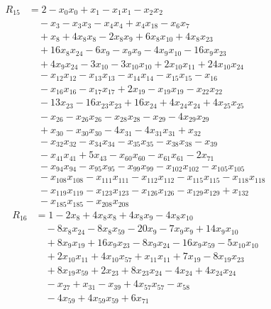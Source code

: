 \begin{align*}
R_{15}&={}2 -x_{0}x_{0} +x_{1} -x_{1}x_{1} -x_{2}x_{2}\\
&\quad{}-x_{3} -x_{3}x_{3} -x_{4}x_{4} +x_{4}x_{18} -x_{6}x_{7}\\
&\quad{}+x_{8} +4x_{8}x_{8} -2x_{8}x_{9} +6x_{8}x_{10} +4x_{8}x_{23}\\
&\quad{}+16x_{8}x_{24} -6x_{9} -x_{9}x_{9} -4x_{9}x_{10} -16x_{9}x_{23}\\
&\quad{}+4x_{9}x_{24} -3x_{10} -3x_{10}x_{10} +2x_{10}x_{11} +24x_{10}x_{24}\\
&\quad{}-x_{12}x_{12} -x_{13}x_{13} -x_{14}x_{14} -x_{15}x_{15} -x_{16}\\
&\quad{}-x_{16}x_{16} -x_{17}x_{17} +2x_{19} -x_{19}x_{19} -x_{22}x_{22}\\
&\quad{}-13x_{23} -16x_{23}x_{23} +16x_{24} +4x_{24}x_{24} +4x_{25}x_{25}\\
&\quad{}-x_{26} -x_{26}x_{26} -x_{28}x_{28} -x_{29} -4x_{29}x_{29}\\
&\quad{}+x_{30} -x_{30}x_{30} -4x_{31} -4x_{31}x_{31} +x_{32}\\
&\quad{}-x_{32}x_{32} -x_{34}x_{34} -x_{35}x_{35} -x_{38}x_{38} -x_{39}\\
&\quad{}-x_{41}x_{41} +5x_{43} -x_{60}x_{60} -x_{61}x_{61} -2x_{71}\\
&\quad{}-x_{94}x_{94} -x_{95}x_{95} -x_{99}x_{99} -x_{102}x_{102} -x_{105}x_{105}\\
&\quad{}-x_{108}x_{108} -x_{111}x_{111} -x_{112}x_{112} -x_{115}x_{115} -x_{118}x_{118}\\
&\quad{}-x_{119}x_{119} -x_{123}x_{123} -x_{126}x_{126} -x_{129}x_{129} +x_{132}\\
&\quad{}-x_{185}x_{185} -x_{208}x_{208}
\end{align*}
\begin{align*}
R_{16}&={}1 -2x_{8} +4x_{8}x_{8} +4x_{8}x_{9} -4x_{8}x_{10}\\
&\quad{}-8x_{8}x_{24} -8x_{8}x_{59} -20x_{9} -7x_{9}x_{9} +14x_{9}x_{10}\\
&\quad{}+8x_{9}x_{19} +16x_{9}x_{23} -8x_{9}x_{24} -16x_{9}x_{59} -5x_{10}x_{10}\\
&\quad{}+2x_{10}x_{11} +4x_{10}x_{57} +x_{11}x_{11} +7x_{19} -8x_{19}x_{23}\\
&\quad{}+8x_{19}x_{59} +2x_{23} +8x_{23}x_{24} -4x_{24} +4x_{24}x_{24}\\
&\quad{}-x_{27} +x_{31} -x_{39} +4x_{57}x_{57} -x_{58}\\
&\quad{}-4x_{59} +4x_{59}x_{59} +6x_{71}
\end{align*}
